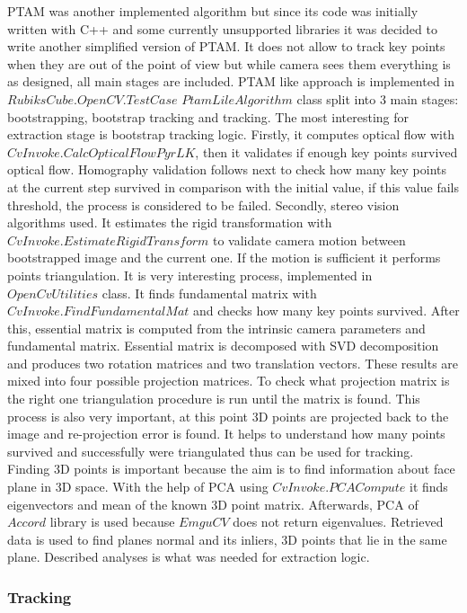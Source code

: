 \documentclass[../../main.tex]{subfiles}
\begin{document}
\ac{PTAM} was another implemented algorithm but since its code was initially written with C++ and some currently unsupported libraries it was decided to write another simplified version of \ac{PTAM}. It does not allow to track key points when they are out of the point of view but while camera sees them everything is as designed, all main stages are included. \ac{PTAM} like approach is implemented in $RubiksCube.OpenCV.TestCase$ $PtamLileAlgorithm$ class split into 3 main stages: bootstrapping, bootstrap tracking and tracking. The most interesting for extraction stage is bootstrap tracking logic. Firstly, it computes optical flow with $CvInvoke.CalcOpticalFlowPyrLK$, then it validates if enough key points survived optical flow. Homography validation follows next to check how many key points at the current step survived in comparison with the initial value, if this value fails threshold, the process is considered to be failed. Secondly, stereo vision algorithms used. It estimates the rigid transformation with $CvInvoke.EstimateRigidTransform$ to validate camera motion between bootstrapped image and the current one. If the motion is sufficient it performs points triangulation. It is very interesting process, implemented in $OpenCvUtilities$ class. It finds fundamental matrix with $CvInvoke.FindFundamentalMat$ and checks how many key points survived. After this, essential matrix is computed from the intrinsic camera parameters and fundamental matrix. Essential matrix is decomposed with \ac{SVD} decomposition and produces two rotation matrices and two translation vectors. These results are mixed into four possible projection matrices. To check what projection matrix is the right one triangulation procedure is run until the matrix is found. This process is also very important, at this point 3D points are projected back to the image and re-projection error is found. It helps to understand how many points survived and successfully were triangulated thus can be used for tracking. Finding 3D points is important because the aim is to find information about face plane in 3D space. With the help of \ac{PCA} using $CvInvoke.PCACompute$ it finds eigenvectors and mean of the known 3D point matrix. Afterwards, \ac{PCA} of $Accord$ library is used because $EmguCV$ does not return eigenvalues. Retrieved data is used to find planes normal and its inliers, 3D points that lie in the same plane. Described analyses is what was needed for extraction logic.

\subsubsection*{Tracking}
\end{document}
